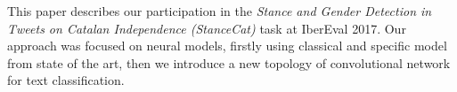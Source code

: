 \abstract

This paper describes our participation in the \emph{Stance and Gender Detection in Tweets on Catalan Independence (StanceCat)} task at IberEval 2017.
Our approach was focused on neural models, firstly using classical and specific model from state of the art, then we introduce a new topology of convolutional network for text classification.